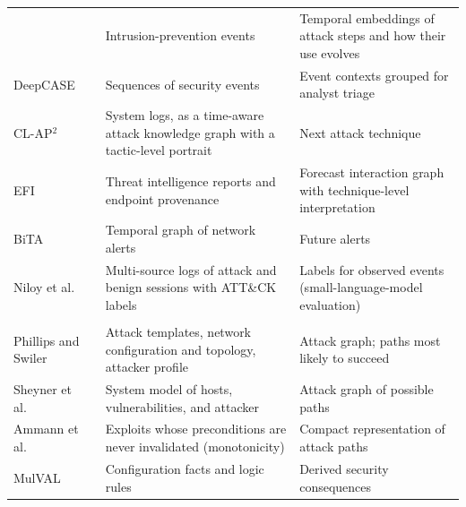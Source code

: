 {\begin{xltabular}{\textwidth}{@{}>{\raggedright\arraybackslash}p{0.22\textwidth}>{\raggedright\arraybackslash}X>{\raggedright\arraybackslash}X@{}}
 & Intrusion-prevention events
 & Temporal embeddings of attack steps and how their use evolves \\
DeepCASE~\cite{vanede2022deepcase}
 & Sequences of security events
 & Event contexts grouped for analyst triage \\
CL-AP$^{2}$~\cite{liu2024clap2}
 & System logs, as a time-aware attack knowledge graph with a tactic-level portrait
 & Next attack technique \\
EFI~\cite{zhu2024nip}
 & Threat intelligence reports and endpoint provenance
 & Forecast interaction graph with technique-level interpretation \\
BiTA~\cite{nayeri2026bita}
 & Temporal graph of network alerts
 & Future alerts \\
Niloy et al.~\cite{niloy2026multi}
 & Multi-source logs of attack and benign sessions with ATT\&CK labels
 & Labels for observed events (small-language-model evaluation) \\
\midrule
{} \\
Phillips and Swiler~\cite{phillips1998graph}
 & Attack templates, network configuration and topology, attacker profile
 & Attack graph; paths most likely to succeed \\
Sheyner et al.~\cite{sheyner2002graphs}
 & System model of hosts, vulnerabilities, and attacker
 & Attack graph of possible paths \\
Ammann et al.~\cite{ammann2002scalable}
 & Exploits whose preconditions are never invalidated (monotonicity)
 & Compact representation of attack paths \\
MulVAL~\cite{ou2005mulval}
 & Configuration facts and logic rules
 & Derived security consequences \\

\end{xltabular}}
